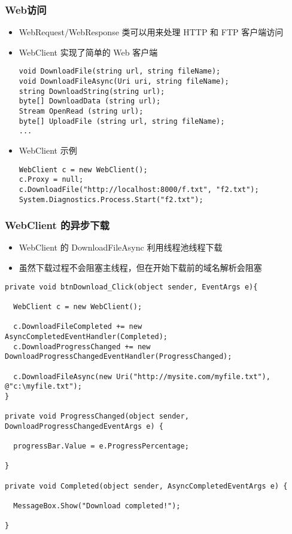 \begin{frame}[fragile]
\frametitle{Web访问}
\begin{itemize}
\item WebRequest/WebResponse 类可以用来处理 HTTP 和 FTP 客户端访问
\item WebClient 实现了简单的 Web 客户端
\begin{lstlisting}
void DownloadFile(string url, string fileName);
void DownloadFileAsync(Uri uri, string fileName);
string DownloadString(string url);
byte[] DownloadData (string url);
Stream OpenRead (string url);
byte[] UploadFile (string url, string fileName);
...
\end{lstlisting}
\item WebClient 示例
\begin{lstlisting}
WebClient c = new WebClient();
c.Proxy = null;
c.DownloadFile("http://localhost:8000/f.txt", "f2.txt");
System.Diagnostics.Process.Start("f2.txt");
\end{lstlisting}
\end{itemize}
\end{frame}

\begin{frame}[fragile]
\frametitle{WebClient 的异步下载}
\begin{itemize}
\item WebClient 的 DownloadFileAsync 利用线程池线程下载
\item 虽然下载过程不会阻塞主线程，但在开始下载前的域名解析会阻塞
\end{itemize}
\lstset{basicstyle=\tiny\ttfamily}
\begin{lstlisting}
private void btnDownload_Click(object sender, EventArgs e){

  WebClient c = new WebClient();

  c.DownloadFileCompleted += new AsyncCompletedEventHandler(Completed);
  c.DownloadProgressChanged += new DownloadProgressChangedEventHandler(ProgressChanged);

  c.DownloadFileAsync(new Uri("http://mysite.com/myfile.txt"), @"c:\myfile.txt");
}

private void ProgressChanged(object sender, DownloadProgressChangedEventArgs e) {

  progressBar.Value = e.ProgressPercentage;

}

private void Completed(object sender, AsyncCompletedEventArgs e) {

  MessageBox.Show("Download completed!");

}
\end{lstlisting}
\end{frame}


